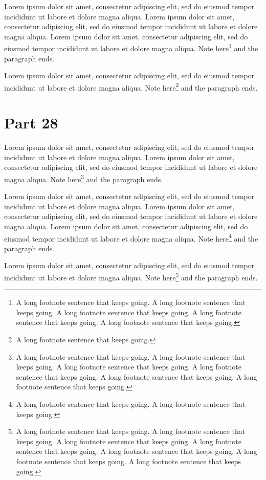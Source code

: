 \documentclass{article}
\begin{document}
Lorem ipsum dolor sit amet, consectetur adipiscing elit, sed do eiusmod tempor incididunt ut labore et dolore magna aliqua. Lorem ipsum dolor sit amet, consectetur adipiscing elit, sed do eiusmod tempor incididunt ut labore et dolore magna aliqua. Lorem ipsum dolor sit amet, consectetur adipiscing elit, sed do eiusmod tempor incididunt ut labore et dolore magna aliqua. Note here\footnote{A long footnote sentence that keeps going. A long footnote sentence that keeps going. A long footnote sentence that keeps going. A long footnote sentence that keeps going. A long footnote sentence that keeps going. } and the paragraph ends.

Lorem ipsum dolor sit amet, consectetur adipiscing elit, sed do eiusmod tempor incididunt ut labore et dolore magna aliqua. Note here\footnote{A long footnote sentence that keeps going. } and the paragraph ends.

\section{Part 28}
Lorem ipsum dolor sit amet, consectetur adipiscing elit, sed do eiusmod tempor incididunt ut labore et dolore magna aliqua. Lorem ipsum dolor sit amet, consectetur adipiscing elit, sed do eiusmod tempor incididunt ut labore et dolore magna aliqua. Note here\footnote{A long footnote sentence that keeps going. A long footnote sentence that keeps going. A long footnote sentence that keeps going. A long footnote sentence that keeps going. A long footnote sentence that keeps going. A long footnote sentence that keeps going. } and the paragraph ends.

Lorem ipsum dolor sit amet, consectetur adipiscing elit, sed do eiusmod tempor incididunt ut labore et dolore magna aliqua. Lorem ipsum dolor sit amet, consectetur adipiscing elit, sed do eiusmod tempor incididunt ut labore et dolore magna aliqua. Lorem ipsum dolor sit amet, consectetur adipiscing elit, sed do eiusmod tempor incididunt ut labore et dolore magna aliqua. Note here\footnote{A long footnote sentence that keeps going. A long footnote sentence that keeps going. } and the paragraph ends.

Lorem ipsum dolor sit amet, consectetur adipiscing elit, sed do eiusmod tempor incididunt ut labore et dolore magna aliqua. Note here\footnote{A long footnote sentence that keeps going. A long footnote sentence that keeps going. A long footnote sentence that keeps going. A long footnote sentence that keeps going. A long footnote sentence that keeps going. A long footnote sentence that keeps going. A long footnote sentence that keeps going. } and the paragraph ends.
\end{document}
